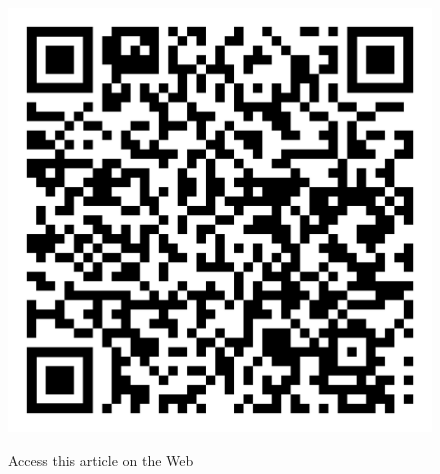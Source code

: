 \begin{figure}[H]
\centering
\includegraphics[scale=.15]{src/Figures/QR-codes/qr-code_nanotechnology.png}

\medskip

{\large\sf Access this article on the Web}
\end{figure}

